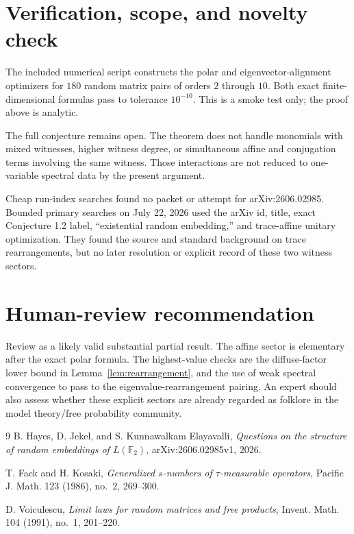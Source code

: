 \documentclass[11pt]{article}
\theoremstyle{remark}
\begin{document}
\section{Verification, scope, and novelty check}

The included numerical script constructs the polar and eigenvector-alignment
optimizers for $180$ random matrix pairs of orders $2$ through $10$.  Both
exact finite-dimensional formulas pass to tolerance $10^{-10}$.  This is a
smoke test only; the proof above is analytic.

The full conjecture remains open.  The theorem does not handle monomials with
mixed witnesses, higher witness degree, or simultaneous affine and
conjugation terms involving the same witness.  Those interactions are not
reduced to one-variable spectral data by the present argument.

Cheap run-index searches found no packet or attempt for arXiv:2606.02985.
Bounded primary searches on July 22, 2026 used the arXiv id, title, exact
Conjecture 1.2 label, ``existential random embedding,'' and trace-affine
unitary optimization.  They found the source and standard background on
trace rearrangements, but no later resolution or explicit record of these
two witness sectors.

\section{Human-review recommendation}

Review as a likely valid substantial partial result.  The affine sector is
elementary after the exact polar formula.  The highest-value checks are the
diffuse-factor lower bound in Lemma~\ref{lem:rearrangement}, and the use of
weak spectral convergence to pass to the eigenvalue-rearrangement pairing.
An expert should also assess whether these explicit sectors are already
regarded as folklore in the model theory/free probability community.

\begin{thebibliography}{9}
B. Hayes, D. Jekel, and S. Kunnawalkam Elayavalli,
\emph{Questions on the structure of random embeddings of $L(\mathbb F_2)$},
arXiv:2606.02985v1, 2026.

T. Fack and H. Kosaki,
\emph{Generalized $s$-numbers of $\tau$-measurable operators},
Pacific J. Math. 123 (1986), no.~2, 269--300.

D. Voiculescu,
\emph{Limit laws for random matrices and free products},
Invent. Math. 104 (1991), no.~1, 201--220.
\end{thebibliography}
\end{document}
